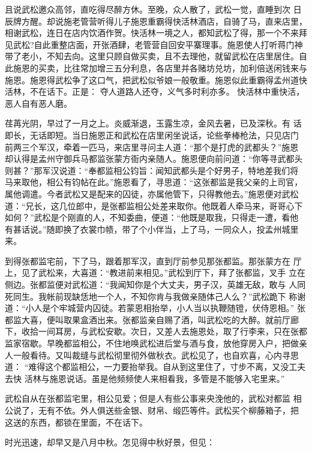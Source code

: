 且说武松邀众高邻，直吃得尽醉方休。至晚，众人散了，武松一觉，直睡到次
日辰牌方醒。却说施老管营听得儿子施恩重霸得快活林酒店，自骑了马，直来店里，
相谢武松，连日在店内饮酒作贺。快活林一境之人，都知武松了得，那一个不来拜
见武松?自此重整店面，开张酒肆，老管营自回安平寨理事。施恩使人打听蒋门神
带了老小，不知去向。这里只顾自做买卖，且不去理他，就留武松在店里居住。自
此施恩的买卖，比往常加增三五分利息，各店里并各赌坊兑坊，加利倍送闲钱来与
施恩。施恩得武松争了这口气，把武松似爷娘一般敬重。施恩似此重霸得孟州道快
活林，不在话下。正是：
夺人道路人还夺，义气多时利亦多。
快活林中重快活，恶人自有恶人磨。

荏苒光阴，早过了一月之上。炎威渐退，玉露生凉，金风去暑，已及深秋。有
话即长，无话即短。当日施恩正和武松在店里闲坐说话，论些拳棒枪法，只见店门
前两三个军汉，牵着一匹马，来店里寻问主人道：“那个是打虎的武都头？”施恩
却认得是孟州守御兵马都监张蒙方衙内亲随人。施恩便向前问道：“你等寻武都头
则甚？”那军汉说道：“奉都监相公钧旨：闻知武都头是个好男子，特地差我们将
马来取他，相公有钧帖在此。”施恩看了，寻思道：“这张都监是我父亲的上司官，
属他调遣。今者武松又是配来的囚徒，亦属他管下，只得教他去。”施恩便对武松
道：“兄长，这几位郎中，是张都监相公处差来取你。他既着人牵马来，哥哥心下
如何？”武松是个刚直的人，不知委曲，便道：“他既是取我，只得走一遭，看他
有甚话说。”随即换了衣裳巾帻，带了个小伴当，上了马，一同众人，投孟州城里
来。

到得张都监宅前，下了马，跟着那军汉，直到厅前参见那张都监。那张蒙方在
厅上，见了武松来，大喜道：“教进前来相见。”武松到厅下，拜了张都监，叉手
立在侧边。张都监便对武松道：“我闻知你是个大丈夫，男子汉，英雄无敌，敢与
人同死同生。我帐前现缺恁地一个人，不知你肯与我做亲随体己人么？”武松跪下
称谢道：“小人是个牢城营内囚徒。若蒙恩相抬举，小人当以执鞭随镫，伏侍恩相。”
张都监大喜，便叫取果盒酒出来。张都监亲自赐了酒，叫武松吃的大醉。就前厅廊
下，收拾一间耳房，与武松安歇。次日，又差人去施恩处，取了行李来，只在张都
监家宿歇。早晚都监相公，不住地唤武松进后堂与酒与食，放他穿房入户，把做亲
人一般看待。又叫裁缝与武松彻里彻外做秋衣。武松见了，也自欢喜，心内寻思道：
“难得这个都监相公，一力要抬举我。自从到这里住了，寸步不离，又没工夫去快
活林与施恩说话。虽是他频频使人来相看我，多管是不能够入宅里来。”

武松自从在张都监宅里，相公见爱；但是人有些公事来央浼他的，武松对都监
相公说了，无有不依。外人俱送些金银、财帛、缎匹等件。武松买个柳藤箱子，把
这送的东西，都锁在里面，不在话下。

时光迅速，却早又是八月中秋。怎见得中秋好景，但见：

